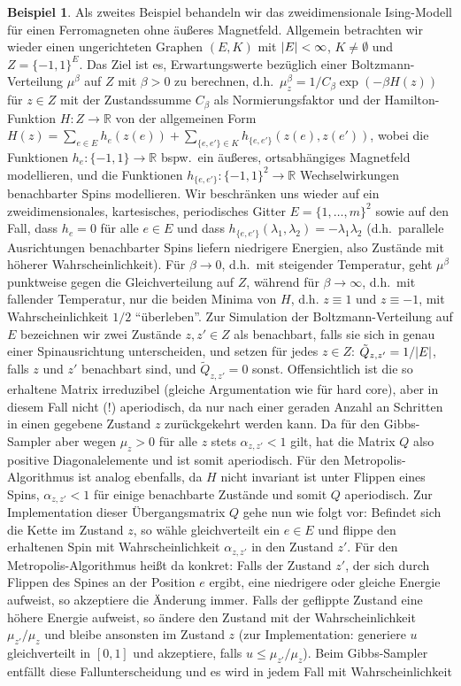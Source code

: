 \documentclass[twoside]{article}
\theoremstyle{definition}
\newtheorem{example}[theorem]{Beispiel}
\begin{document}
\begin{example}
Als zweites Beispiel behandeln wir das zweidimensionale Ising-Modell für einen Ferromagneten ohne äußeres Magnetfeld. Allgemein betrachten wir wieder einen ungerichteten Graphen $(E,K)$ mit $\abs{E} < \infty$, $K \neq \emptyset$ und $Z =\{-1,1\}^E$. Das Ziel ist es, Erwartungswerte bezüglich einer Boltzmann-Verteilung $\mu^\beta$ auf $Z$ mit $\beta>0$ zu berechnen, d.h.\ $\mu^\beta_z = 1/C_\beta \exp(-\beta H(z))$ für $z \in Z$ mit der Zustandssumme $C_\beta$ als Normierungsfaktor und der Hamilton-Funktion $H:Z\to \mathbb{R}$ von der allgemeinen Form $H(z) = \sum_{e \in E} h_e(z(e)) + \sum_{\{e,e'\}\in K} h_{\{e,e'\}}(z(e),z(e'))$, wobei die Funktionen $h_e:\{-1,1\} \to \mathbb{R}$ bspw.\ ein äußeres, ortsabhängiges Magnetfeld modellieren, und die Funktionen $h_{\{e,e'\}}:\{-1,1\}^2\to \mathbb{R}$ Wechselwirkungen benachbarter Spins modellieren. Wir beschränken uns wieder auf ein zweidimensionales, kartesisches, periodisches Gitter $E=\{1,\dots,m\}^2$ sowie auf den Fall, dass $h_e = 0$ für alle $e \in E$ und dass $h_{\{e,e'\}}(\lambda_1,\lambda_2)=-\lambda_1 \lambda_2$ (d.h.\ parallele Ausrichtungen benachbarter Spins liefern niedrigere Energien, also Zustände mit höherer Wahrscheinlichkeit). Für $\beta \to 0$, d.h.\ mit steigender Temperatur, geht $\mu^\beta$ punktweise gegen die Gleichverteilung auf $Z$, während für $\beta \to \infty$, d.h.\ mit fallender Temperatur, nur die beiden Minima von $H$, d.h. $z \equiv 1$ und $z \equiv -1$, mit Wahrscheinlichkeit $1/2$ \enquote{überleben}. Zur Simulation der Boltzmann-Verteilung auf $E$ bezeichnen wir zwei Zustände $z,z' \in Z$ als benachbart, falls sie sich in genau einer Spinausrichtung unterscheiden, und setzen für jedes $z \in Z$: $\tilde{Q}_{z,z'} = 1/\abs{E}$, falls $z$ und $z'$ benachbart sind, und $\tilde{Q}_{z,z'}=0$ sonst. Offensichtlich ist die so erhaltene Matrix irreduzibel (gleiche Argumentation wie für hard core), aber in diesem Fall nicht (!) aperiodisch, da nur nach einer geraden Anzahl an Schritten in einen gegebene Zustand $z$ zurückgekehrt werden kann. Da für den Gibbs-Sampler aber wegen $\mu_z>0$ für alle $z$ stets $\alpha_{z,z'}<1$ gilt, hat die Matrix $Q$  also positive Diagonalelemente und ist somit aperiodisch. Für den Metropolis-Algorithmus ist analog ebenfalls, da $H$ nicht invariant ist unter Flippen eines Spins, $\alpha_{z,z'} <1$ für einige benachbarte Zustände und somit $Q$ aperiodisch. Zur Implementation dieser Übergangsmatrix $Q$ gehe nun wie folgt vor: Befindet sich die Kette im Zustand $z$, so wähle gleichverteilt ein $e \in E$ und flippe den erhaltenen Spin mit Wahrscheinlichkeit $\alpha_{z,z'}$ in den Zustand $z'$. Für den Metropolis-Algorithmus heißt da konkret: Falls der Zustand $z'$, der sich durch Flippen des Spines an der Position $e$ ergibt, eine niedrigere oder gleiche Energie aufweist, so akzeptiere die Änderung immer. Falls der geflippte Zustand eine höhere Energie aufweist, so ändere den Zustand mit der Wahrscheinlichkeit $\mu_{z'}/\mu_z$ und bleibe ansonsten im Zustand $z$ (zur Implementation: generiere $u$ gleichverteilt in $[0,1]$ und akzeptiere, falls $u \leq \mu_{z'}/\mu_z$). Beim Gibbs-Sampler entfällt diese Fallunterscheidung und es wird in jedem Fall mit Wahrscheinlichkeit 
\end{example}
\end{document}
